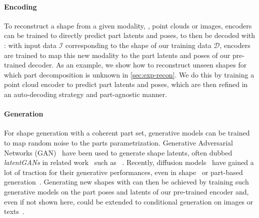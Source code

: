
\paragraph{Encoding}
To reconstruct a shape from a given modality, \eg, point clouds or images, encoders can be trained to directly predict part latents and poses, to then be decoded with \PSDF{}: with input data $\mathcal{I}$ corresponding to the shape of our training data $\mathcal{D}$, encoders are trained to map this new modality to the part latents and poses of our pre-trained decoder.
%
As an example, we show how to reconstruct unseen shapes for which part decomposition is unknown in \cref{sec:exp-recon}.
We do this by training a point cloud encoder to predict part latents and poses, which are then refined in an auto-decoding strategy and part-agnostic manner.


\paragraph{Generation}
For shape generation with a coherent part set, generative models can be trained to map random noise to the parts parametrization. Generative Adversarial Networks (GAN)~\cite{Goodfellow14b} have been used to generate shape latents, often dubbed \textit{latentGANs} in related work~\cite{Achlioptas18b, Chen19c} such as \PQNET~\cite{Wu20c}. Recently, diffusion models~\cite{Sohl15, Ho20a} have gained a lot of traction for their generative performances, even in shape~\cite{Zhang23d} or part-based generation~\cite{Koo23}. Generating new shapes with \PSDF{} can then be achieved by training such generative models on the part poses and latents of our pre-trained encoder and, even if not shown here, could be extended to conditional generation on images or texts~\cite{Zhang23d, Koo23}.



\iffalse

\paragraph{Global to local decoder}
Possible to map a global latent vector to the local ones (and poses). This serves as a global prior ontop of the part decoder. \NT{Keep only if I actually make use of this in experiments}

\fi